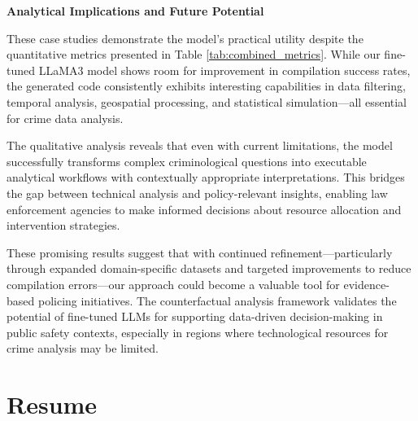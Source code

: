 \noindent \textbf{Analytical Implications and Future Potential}

These case studies demonstrate the model's practical utility despite the quantitative metrics presented in Table \ref{tab:combined_metrics}. While our fine-tuned LLaMA3 model shows room for improvement in compilation success rates, the generated code consistently exhibits interesting capabilities in data filtering, temporal analysis, geospatial processing, and statistical simulation—all essential for crime data analysis.

The qualitative analysis reveals that even with current limitations, the model successfully transforms complex criminological questions into executable analytical workflows with contextually appropriate interpretations. This bridges the gap between technical analysis and policy-relevant insights, enabling law enforcement agencies to make informed decisions about resource allocation and intervention strategies.

These promising results suggest that with continued refinement—particularly through expanded domain-specific datasets and targeted improvements to reduce compilation errors—our approach could become a valuable tool for evidence-based policing initiatives. The counterfactual analysis framework validates the potential of fine-tuned LLMs for supporting data-driven decision-making in public safety contexts, especially in regions where technological resources for crime analysis may be limited.


\section{Resume}

